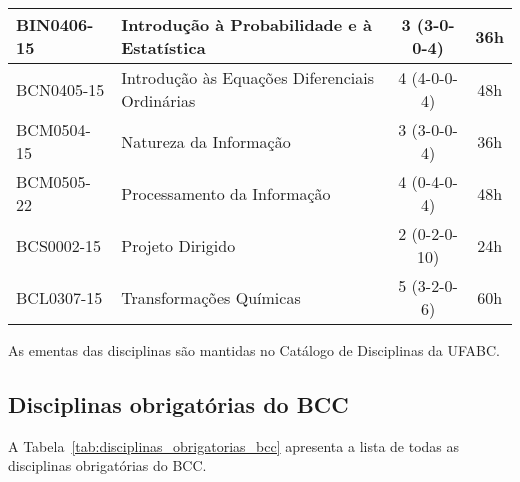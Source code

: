 \begin{table}[h!]
\begin{tabular}{|l|p{}|c|c|}
        BIN0406-15 & Introdução à Probabilidade e à Estatística & 3 (3-0-0-4) & 36h\\
        \hline
        BCN0405-15 & Introdução às Equações Diferenciais Ordinárias & 4 (4-0-0-4) & 48h \\
        \hline
        BCM0504-15 & Natureza da Informação & 3 (3-0-0-4) & 36h\\
        \hline
        BCM0505-22 & Processamento da Informação & 4 (0-4-0-4) & 48h\\
        \hline
        BCS0002-15 & Projeto Dirigido & 2 (0-2-0-10) & 24h\\
        \hline
        BCL0307-15 & Transformações Químicas & 5 (3-2-0-6) & 60h\\
        \hline
    \end{tabular}
\end{table}

As ementas das disciplinas são mantidas no Catálogo de Disciplinas da UFABC.

\subsection{Disciplinas obrigatórias do BCC}
\label{sec:disciplinas_obrigatorais_ementas}

A Tabela~\ref{tab:disciplinas_obrigatorias_bcc} apresenta a lista de todas as
disciplinas obrigatórias do BCC.


